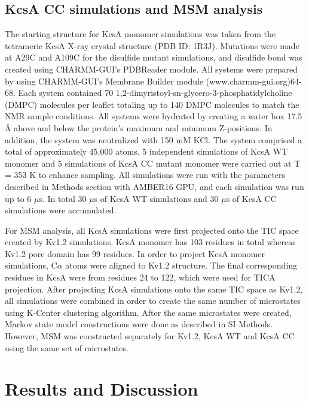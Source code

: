 \subsection{KcsA CC simulations and MSM analysis}
The starting structure for KcsA monomer simulations was taken from the tetrameric KcsA X-ray crystal structure (PDB ID: 1R3J). Mutations were made at A29C and A109C for the disulfide mutant simulations, and disulfide bond was created using CHARMM-GUI’s PDBReader module. All systems were prepared by using CHARMM-GUI’s Membrane Builder module (www.charmm-gui.org)64-68. Each system contained 70 1,2-dimyristoyl-sn-glycero-3-phosphatidylcholine (DMPC) molecules per leaflet totaling up to 140 DMPC molecules to match the NMR sample conditions. All systems were hydrated by creating a water box 17.5 Å above and below the protein’s maximum and minimum Z-positions. In addition, the system was neutralized with 150 mM KCl. The system comprised a total of approximately 45,000 atoms. 5 independent simulations of KcsA WT monomer and 5 simulations of KcsA CC mutant monomer were carried out at T = 353 K to enhance sampling. All simulations were run with the parameters described in Methods section with AMBER16 GPU, and each simulation was run up to 6 $\mu$s. In total 30 $\mu$s of KcsA WT simulations and 30 $\mu$s of KcsA CC simulations were accumulated.

For MSM analysis, all KcsA simulations were first projected onto the TIC space created by Kv1.2 simulations. KcsA monomer has 103 residues in total whereas Kv1.2 pore domain has 99 residues. In order to project KcsA monomer simulations, C$\alpha$ atoms were aligned to Kv1.2 structure. The final corresponding residues in KcsA were from residues 24 to 122, which were used for TICA projection. After projecting KcsA simulations onto the same TIC space as Kv1.2, all simulations were combined in order to create the same number of microstates using K-Center clustering algorithm. After the same microstates were created, Markov state model constructions were done as described in SI Methods. However, MSM was constructed separately for Kv1.2, KcsA WT and KcsA CC using the same set of microstates.

\section{Results and Discussion}
